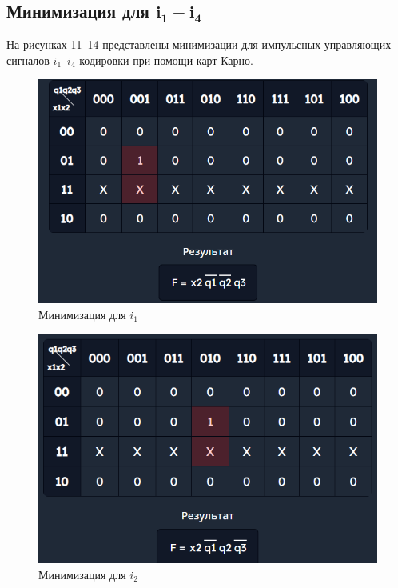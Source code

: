 \documentclass[11pt,a4paper,final]{article} %
\begin{document}
\subsection{Минимизация для $\mathbf{i_1-i_4}$}

На \hyperref[fig:i1]{рисунках 11--14} представлены минимизации для импульсных управляющих сигналов $i_1$--$i_4$ кодировки при помощи карт Карно.

\newpage
\begin{figure}[H]
	\centering
	\includegraphics[width=0.9 \linewidth]{img/i1.png}
	\caption{Минимизация для $i_1$}
	\label{fig:i1}
\end{figure}

\begin{figure}[H]
	\centering
	\includegraphics[width=0.9 \linewidth]{img/i2.png}
	\caption{Минимизация для $i_2$}
	\label{fig:i2}
\end{figure}
\end{document}
